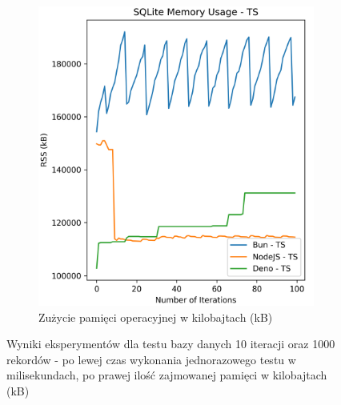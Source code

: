 \begin{figure}[H]
\begin{subfigure}[b]{0.42\textwidth}
    \centering
    \includegraphics[width=\textwidth]{Figures/database/sqlite_100_1000_ts_memory.png}
    \caption{Zużycie pamięci operacyjnej w kilobajtach (kB)}
    \label{fig:database_e2_ts_memory}
  \end{subfigure}
  \caption{Wyniki eksperymentów dla testu bazy danych 10 iteracji oraz 1000 rekordów - po lewej czas wykonania jednorazowego testu w milisekundach, po prawej ilość zajmowanej pamięci w kilobajtach (kB)}
  \label{fig:database_e2_ts}
\end{figure}
